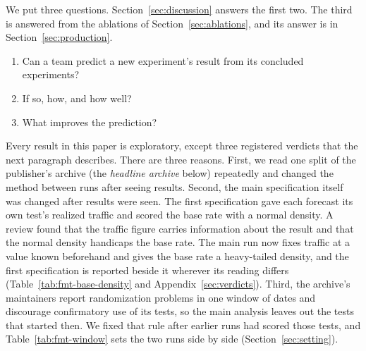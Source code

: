 \documentclass[sigconf,nonacm]{acmart}
\begin{document}
We put three questions. Section~\ref{sec:discussion} answers the first two. The third is answered from the ablations of Section~\ref{sec:ablations}, and its answer is in Section~\ref{sec:production}.
\begin{enumerate}
\item[RQ1] Can a team predict a new experiment's result from its concluded experiments?
\item[RQ2] If so, how, and how well?
\item[RQ3] What improves the prediction?
\end{enumerate}
Every result in this paper is exploratory, except three registered verdicts that the next paragraph describes. There are three reasons. First, we read one split of the publisher's archive (the \emph{headline archive} below) repeatedly and changed the method between runs after seeing results. Second, the main specification itself was changed after results were seen. The first specification gave each forecast its own test's realized traffic and scored the base rate with a normal density. A review found that the traffic figure carries information about the result and that the normal density handicaps the base rate. The main run now fixes traffic at a value known beforehand and gives the base rate a heavy-tailed density, and the first specification is reported beside it wherever its reading differs (Table~\ref{tab:fmt-base-density} and Appendix~\ref{sec:verdicts}). Third, the archive's maintainers report randomization problems in one window of dates and discourage confirmatory use of its tests, so the main analysis leaves out the tests that started then. We fixed that rule after earlier runs had scored those tests, and Table~\ref{tab:fmt-window} sets the two runs side by side (Section~\ref{sec:setting}).
\end{document}
